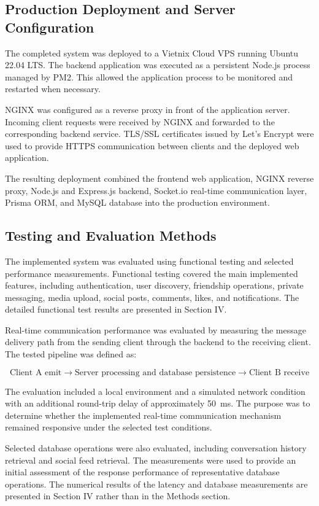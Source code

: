 \documentclass[12pt, a4paper]{article}
\begin{document}
\subsection{Production Deployment and Server Configuration}

The completed system was deployed to a Vietnix Cloud VPS running Ubuntu 22.04 LTS. The backend application was executed as a persistent Node.js process managed by PM2. This allowed the application process to be monitored and restarted when necessary.

NGINX was configured as a reverse proxy in front of the application server. Incoming client requests were received by NGINX and forwarded to the corresponding backend service. TLS/SSL certificates issued by Let's Encrypt were used to provide HTTPS communication between clients and the deployed web application.

The resulting deployment combined the frontend web application, NGINX reverse proxy, Node.js and Express.js backend, Socket.io real-time communication layer, Prisma ORM, and MySQL database into the production environment.


\subsection{Testing and Evaluation Methods}

The implemented system was evaluated using functional testing and selected performance measurements. Functional testing covered the main implemented features, including authentication, user discovery, friendship operations, private messaging, media upload, social posts, comments, likes, and notifications. The detailed functional test results are presented in Section IV.

Real-time communication performance was evaluated by measuring the message delivery path from the sending client through the backend to the receiving client. The tested pipeline was defined as:

\[
\text{Client A emit}
\rightarrow
\text{Server processing and database persistence}
\rightarrow
\text{Client B receive}
\]

The evaluation included a local environment and a simulated network condition with an additional round-trip delay of approximately 50~ms. The purpose was to determine whether the implemented real-time communication mechanism remained responsive under the selected test conditions.

Selected database operations were also evaluated, including conversation history retrieval and social feed retrieval. The measurements were used to provide an initial assessment of the response performance of representative database operations. The numerical results of the latency and database measurements are presented in Section IV rather than in the Methods section.
\end{document}
